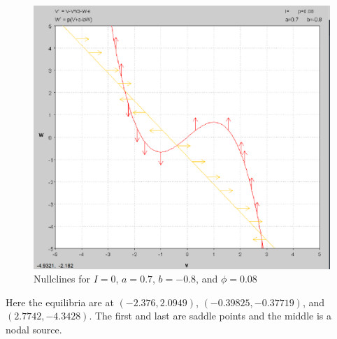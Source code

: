 \documentclass[../Orator]{subfiles}
\begin{document}
\begin{figure}[h]
    \centering
    \includegraphics[width=400pt]{Pictures/Alex/Nullclines - negative.PNG}
    \caption{Nullclines for \(I=0\), \(a=0.7\), \(b=-0.8\), and \(\phi=0.08\)}
    \label{fig:nullclines-negative}
\end{figure}

Here the equilibria are at \((-2.376, 2.0949)\), \((-0.39825, -0.37719)\), and \((2.7742, -4.3428)\). The first and last are saddle points and the middle is a nodal source.

\end{document}
